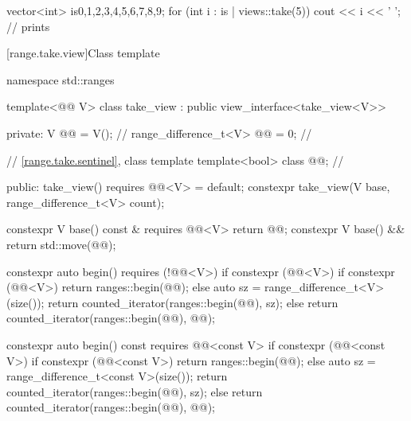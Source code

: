 \pnum
\begin{example}
\begin{codeblock}
vector<int> is{0,1,2,3,4,5,6,7,8,9};
for (int i : is | views::take(5))
  cout << i << ' '; // prints 
\end{codeblock}
\end{example}

[range.take.view]{Class template }

%
%
%
%
%
\begin{codeblock}
namespace std::ranges {
  template<@@ V>
  class take_view : public view_interface<take_view<V>> {
  private:
    V @@ = V();                                      // \expos
    range_difference_t<V> @@ = 0;                   // \expos

    // \ref{range.take.sentinel}, class template 
    template<bool> class @@;                      // \expos

  public:
    take_view() requires @@<V> = default;
    constexpr take_view(V base, range_difference_t<V> count);

    constexpr V base() const & requires @@<V> { return @@; }
    constexpr V base() && { return std::move(@@); }

    constexpr auto begin() requires (!@@<V>) {
      if constexpr (@@<V>) {
        if constexpr (@@<V>) {
          return ranges::begin(@@);
        } else {
          auto sz = range_difference_t<V>(size());
          return counted_iterator(ranges::begin(@@), sz);
        }
      } else {
        return counted_iterator(ranges::begin(@@), @@);
      }
    }

    constexpr auto begin() const requires @@<const V> {
      if constexpr (@@<const V>) {
        if constexpr (@@<const V>) {
          return ranges::begin(@@);
        } else {
          auto sz = range_difference_t<const V>(size());
          return counted_iterator(ranges::begin(@@), sz);
        }
      } else {
        return counted_iterator(ranges::begin(@@), @@);
      }
    }

}}
\end{codeblock}
